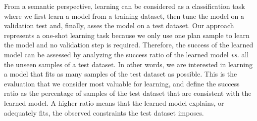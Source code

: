 \documentclass{ecai}
\begin{document}
From a semantic perspective, learning can be considered as a classification task where we first learn a model from a training dataset, then tune the model on a validation test and, finally, asses the model on a test dataset. Our approach represents a one-shot learning task because we only use one plan sample to learn the model and no validation step is required.
Therefore, the success of the learned model can be assessed by analyzing the success ratio of the learned model \emph{vs.} all the unseen samples of a test dataset. In other words, we are interested in learning a model that fits as many samples of the test dataset as possible. This is the evaluation that we consider most valuable for learning, and define the success ratio as the percentage of samples of the test dataset that are consistent with the learned model. A higher ratio means that the learned model explains, or adequately fits, the observed constraints the test dataset imposes.
\end{document}
